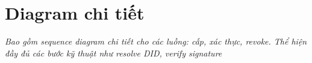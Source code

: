 \chapter{Diagram chi tiết}
\textit{Bao gồm sequence diagram chi tiết cho các luồng: cấp, xác thực, revoke. Thể hiện đầy đủ các bước kỹ thuật như resolve DID, verify signature}